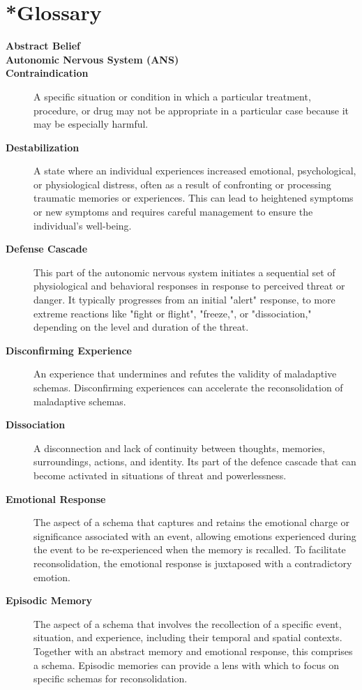 \documentclass[12pt,letterpaper]{article}
\begin{document}
\section{*Glossary}
\label{sec:glossary}
\begin{description}
    \item[\textbf{Abstract Belief}] \todo{}
    \item[\textbf{Autonomic Nervous System (ANS)}] 
    \item[\textbf{Contraindication}] A specific situation or condition in which a particular treatment, procedure, or drug may not be appropriate in a particular case because it may be especially harmful.
    \item[\textbf{Destabilization}] A state where an individual experiences increased emotional, psychological, or physiological distress, often as a result of confronting or processing traumatic memories or experiences. This can lead to heightened symptoms or new symptoms and requires careful management to ensure the individual's well-being.
    \item[\textbf{Defense Cascade}] This part of the autonomic nervous system initiates a sequential set of physiological and behavioral responses in response to perceived threat or danger. It typically progresses from an initial "alert" response, to more extreme reactions like "fight or flight", "freeze,", or "dissociation," depending on the level and duration of the threat.
    \item[\textbf{Disconfirming Experience}] An experience that undermines and refutes the validity of maladaptive schemas. Disconfirming experiences can accelerate the reconsolidation of maladaptive schemas.
    \item[\textbf{Dissociation}] A disconnection and lack of continuity between thoughts, memories, surroundings, actions, and identity. Its part of the defence cascade that can become activated in situations of threat and powerlessness.
    \item[\textbf{Emotional Response}] The aspect of a schema that captures and retains the emotional charge or significance associated with an event, allowing emotions experienced during the event to be re-experienced when the memory is recalled. To facilitate reconsolidation, the emotional response is juxtaposed with a contradictory emotion.
    \item[\textbf{Episodic Memory}] The aspect of a schema that involves the recollection of a specific event, situation, and experience, including their temporal and spatial contexts. Together with an abstract memory and emotional response, this comprises a schema. Episodic memories can provide a lens with which to focus on specific schemas for reconsolidation.

\end{description}
\end{document}

